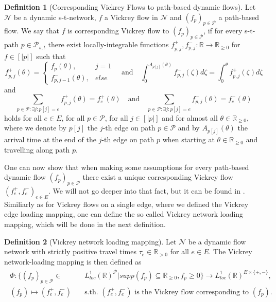 \documentclass[reqno,openany]{amsbook}
\theoremstyle{definition}
\newtheorem{definition}{Definition}[chapter]
\theoremstyle{plain}
\begin{document}
\begin{definition}[Corresponding Vickrey Flows to path-based dynamic flows]
Let $\mathcal{N}$ be a dynamic s-t-network, $f$ a Vickrey flow in $\mathcal{N}$ and $(f_p)_{p \in \mathcal{P}}$  a path-based flow. We say that $f$ is corresponding Vickrey flow to $(f_p)_{p \in \mathcal{P}}$, if for every s-t-path $p \in \mathcal{P}_{s,t}$ there exist locally-integrable functions $f_{p,j}^+, f_{p,j}^-: \mathbb{R} \to \mathbb{R}_{\geq 0}$ for $f \in [\lvert p \rvert]$ such that
\[ f_{p,j}^+(\theta) = \begin{cases} f_p(\theta),& j = 1 \\ f_{p,j-1}^-(\theta) ,& else \end{cases} \quad \text{and} \quad \int_0^{A_{p[j]}(\theta)} f_{p,j}^-(\zeta) d\zeta = \int_0^{\theta} f_{p,j}^+(\zeta) d\zeta \]
and
\[ \sum_{p \in \mathcal{P}: \exists j: p[j] = e} f_{p,j}^+(\theta) = f_e^+(\theta) \quad \text{and} \quad \sum_{p \in \mathcal{P}: \exists j: p[j] = e} f_{p,j}^-(\theta) = f_e^-(\theta) \]
holds for all $e \in E$, for all $p \in \mathcal{P}$, for all $j \in [\lvert p \rvert]$ and for almost all $\theta \in \mathbb{R}_{\geq 0}$, where we denote by $p[j]$ the $j$-th edge on path $p \in \mathcal{P}$ and by $A_{p[j]}(\theta)$ the arrival time at the end of the $j$-th edge on path $p$ when starting at $\theta \in \mathbb{R}_{\geq 0}$ and travelling along path $p$.
\end{definition}

One can now show that when making some assumptions for every path-based dynamic flow $(f_p)_{p \in \mathcal{P}}$ there exist a unique corresponding Vickrey flow $(f_e^+, f_e^-)_{e \in E}$. We will not go deeper into that fact, but it can be found in \cite[Lemma 13]{CCL1}. Similiarly as for Vickrey flows on a single edge, where we defined the Vickrey edge loading mapping, one can define the so called Vickrey network loading mapping, which will be done in the next definition.

\begin{definition}[Vickrey network loading mapping]
Let $\mathcal{N}$ be a dynamic flow network with strictly positive travel times $\tau_e \in \mathbb{R}_{> 0}$ for all $e \in E$. The Vickrey network-loading mapping is then defined as 
\begin{align}
	\begin{split}
		\Phi: \{ (f_p)_{p \in \mathcal{P}} \in &L_{loc}^1(\mathbb{R})^{\mathcal{P}} \vert supp(f_p) \subseteq 
		\mathbb{R}_{\geq 0}, f_p \geq 0 \} \to L_{loc}^1(\mathbb{R})^{E \times \{+,-\}}, \\
		(f_p) \mapsto (f_e^+, f_e^-) \quad &\text{s.th. $(f_e^+, f_e^-)$ is the Vickrey flow corresponding to $(f_p)$.}
	\end{split}
\end{align}
\end{definition}
\end{document}
